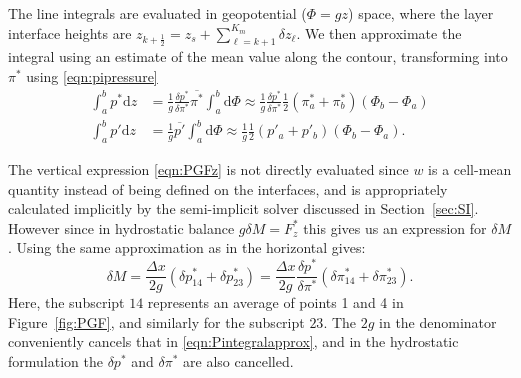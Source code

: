 \documentclass[10pt,letterpaper,margin=1in]{memoir}
\newcommand{\redtext}[1]{\textcolor{red}{[#1]}}  %
\newcommand{\half}{\frac{1}{2}}
\begin{document}
The line integrals are evaluated in geopotential ($\Phi = gz$) space, where the layer interface heights are $z_{k+\half} = z_s + \sum_{\ell=k+1}^{K_m} \delta z_\ell$.
We then approximate the integral using an estimate of the mean value along the contour, transforming into $\pi^*$ using \eqref{eqn:pipressure}
\begin{equation} \label{eqn:Pintegralapprox}
  \begin{split}
    \int_a^b p^* \mathrm{d}z &= \frac{1}{g}\frac{\delta p^*}{\delta \pi^*}\overline{\pi^*}\int_a^b \mathrm{d}\Phi \approx \frac{1}{g} \frac{\delta p^*}{\delta \pi^*} \frac{1}{2} \left(\pi^*_a + \pi^*_b  \right ) \left ( \Phi_b - \Phi_a \right ) \\
    \int_a^b p' \mathrm{d}z &= \frac{1}{g}\overline{p'}\int_a^b \mathrm{d}\Phi \approx \frac{1}{g}  \frac{1}{2} \left(p'_a + p'_b  \right ) \left ( \Phi_b - \Phi_a \right ).
  \end{split}
\end{equation}

The vertical expression \eqref{eqn:PGFz} is not directly evaluated since $w$ is a cell-mean quantity instead of being defined on the interfaces, and is appropriately calculated implicitly by the semi-implicit solver discussed in Section~\ref{sec:SI}. However since in hydrostatic balance $g\delta M = F^*_z$ this gives us an expression for $\delta M$. Using the same approximation as in the horizontal gives:
\begin{equation} \label{eqn:PGFmass}
  \delta M = \frac{\Delta x}{2g} \left ( \delta p^*_{14} + \delta p^*_{23} \right ) = \frac{\Delta x}{2g} \frac{\delta p^*}{\delta \pi^*} \left ( \delta \pi^*_{14} + \delta \pi^*_{23} \right ).
\end{equation}
Here, the subscript $14$ represents an average of points 1 and 4 in Figure~\ref{fig:PGF}, and similarly for the subscript $23$. 
The $2g$ in the denominator conveniently cancels that in \ref{eqn:Pintegralapprox}, and in the hydrostatic formulation the $\delta p^*$ and $\delta \pi^*$ are also cancelled. 


\end{document}
